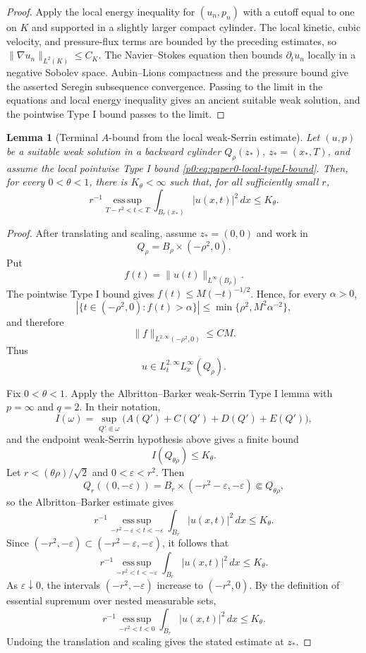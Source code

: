\documentclass[11pt]{amsart}
\theoremstyle{plain}
\newtheorem{lemma}[lemma]{Lemma}
\theoremstyle{definition}
\theoremstyle{remark}
\numberwithin{equation}{section}
\newcommand{\eps}{\varepsilon}
\newcommand{\esssup}{\operatorname*{ess\,sup}}
\begin{document}
\begin{proof}
Apply the local energy inequality for \((u_n,p_n)\) with a cutoff equal to one
on \(K\) and supported in a slightly larger compact cylinder.  The local
kinetic, cubic velocity, and pressure-flux terms are bounded by the preceding
estimates, so \(\|\nabla u_n\|_{L^2(K)}\le C_K\).  The Navier--Stokes
equation then bounds \(\partial_tu_n\) locally in a negative Sobolev space.
Aubin--Lions compactness and the pressure bound give the asserted Seregin
subsequence convergence.  Passing to the limit in the equations and local
energy inequality gives an ancient suitable weak solution, and the pointwise
Type I bound passes to the limit.
\end{proof}

\begin{lemma}[Terminal \(A\)-bound from the local weak-Serrin estimate]
\label{p0:lem:terminal-A-from-weak-serrin}
Let \((u,p)\) be a suitable weak solution in a backward cylinder
\(Q_\rho(z_*)\), \(z_*=(x_*,T)\), and assume the local pointwise Type I bound
\eqref{p0:eq:paper0-local-typeI-bound}.  Then, for every \(0<\theta<1\),
there is \(K_\theta<\infty\) such that, for all sufficiently small \(r\),
\[
   r^{-1}
   \esssup_{T-r^2<t<T}
   \int_{B_r(x_*)}|u(x,t)|^2\,dx
   \le K_\theta .
\]
\end{lemma}

\begin{proof}
After translating and scaling, assume \(z_*=(0,0)\) and work in
\[
   Q_\rho=B_\rho\times(-\rho^2,0).
\]
Put
\[
   f(t)=\|u(t)\|_{L^\infty(B_\rho)} .
\]
The pointwise Type I bound gives \(f(t)\le M(-t)^{-1/2}\).  Hence, for every
\(\alpha>0\),
\[
   |\{t\in(-\rho^2,0): f(t)>\alpha\}|
   \le \min\{\rho^2,M^2\alpha^{-2}\},
\]
and therefore
\[
   \|f\|_{L^{2,\infty}(-\rho^2,0)}\le C M .
\]
Thus
\[
   u\in L_t^{2,\infty}L_x^\infty(Q_\rho).
\]

Fix \(0<\theta<1\).  Apply the Albritton--Barker weak-Serrin Type I lemma
\cite[Lemma 2.5]{AlbrittonBarker2019} with \(p=\infty\) and \(q=2\).  In
their notation,
\[
   I(\omega)
   =
   \sup_{Q'\Subset\omega}\bigl(A(Q')+C(Q')+D(Q')+E(Q')\bigr),
\]
and the endpoint weak-Serrin hypothesis above gives a finite bound
\[
   I(Q_{\theta\rho})\le K_\theta .
\]
Let \(r<(\theta\rho)/\sqrt{2}\) and \(0<\eps<r^2\).  Then
\[
   Q_r((0,-\eps))=B_r\times(-r^2-\eps,-\eps)\Subset Q_{\theta\rho},
\]
so the Albritton--Barker estimate gives
\[
   r^{-1}\esssup_{-r^2-\eps<t<-\eps}
   \int_{B_r}|u(x,t)|^2\,dx
   \le K_\theta .
\]
Since \((-r^2,-\eps)\subset(-r^2-\eps,-\eps)\), it follows that
\[
   r^{-1}\esssup_{-r^2<t<-\eps}
   \int_{B_r}|u(x,t)|^2\,dx
   \le K_\theta .
\]
As \(\eps\downarrow0\), the intervals \((-r^2,-\eps)\) increase to
\((-r^2,0)\).  By the definition of essential supremum over nested measurable
sets,
\[
   r^{-1}\esssup_{-r^2<t<0}
   \int_{B_r}|u(x,t)|^2\,dx
   \le K_\theta .
\]
Undoing the translation and scaling gives the stated estimate at \(z_*\).
\end{proof}
\end{document}
